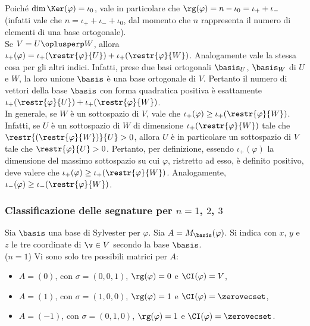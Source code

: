 \begin{remark}
	\li Poiché $\dim \Ker(\varphi) = \iota_0$, vale in particolare che $\rg(\varphi) = n - \iota_0 = \iota_+ + \iota_-$ (infatti vale che $n = \iota_+ + \iota_- + \iota_0$, dal momento che $n$ rappresenta il numero di elementi di una base ortogonale). \\
	
	\li Se $V = U \oplusperp W$, allora $\iota_+(\varphi) = \iota_+(\restr{\varphi}{U}) + \iota_+(\restr{\varphi}{W})$.
	Analogamente vale la stessa cosa per gli altri indici. Infatti,
	prese due basi ortogonali $\basis_U$, $\basis_W$ di $U$ e $W$,
	la loro unione $\basis$ è una base ortogonale di $V$. Pertanto
	il numero di vettori della base $\basis$ con forma quadratica positiva
	è esattamente $\iota_+(\restr{\varphi}{U}) + \iota_+(\restr{\varphi}{W})$. \\
	
	\li In generale, se $W$ è un sottospazio di $V$, vale che $\iota_+(\varphi) \geq \iota_+(\restr{\varphi}{W})$.
	Infatti, se $U$ è un sottospazio di $W$ di dimensione $\iota_+(\restr{\varphi}{W})$ tale che
	$\restr{(\restr{\varphi}{W})}{U} > 0$, allora $U$ è in particolare un sottospazio di $V$ tale che $\restr{\varphi}{U} > 0$. Pertanto, per definizione, essendo $\iota_+(\varphi)$ la dimensione del massimo sottospazio su cui $\varphi$, ristretto ad esso, è definito positivo, deve valere che $\iota_+(\varphi) \geq \iota_+(\restr{\varphi}{W})$. Analogamente, $\iota_-(\varphi) \geq \iota_-(\restr{\varphi}{W})$.
\end{remark}

\subsubsection{Classificazione delle segnature per $n = 1$, $2$, $3$}

Sia $\basis$ una base di Sylvester per $\varphi$. Sia $A = M_\basis(\varphi)$. Si indica con $x$, $y$ e $z$
le tre coordinate di $\v \in V$ secondo la base $\basis$. \\

\mbox{($n = 1$)} Vi sono solo tre possibili matrici per $A$:

\begin{itemize}
	\item $A = (0)$, con $\sigma = (0, 0, 1)$, $\rg(\varphi) = 0$ e $\CI(\varphi) = V$,
	\item $A = (1)$, con $\sigma = (1, 0, 0)$, $\rg(\varphi) = 1$ e $\CI(\varphi) = \zerovecset$,
	\item $A = (-1)$, con $\sigma = (0, 1, 0)$, $\rg(\varphi) = 1$ e $\CI(\varphi) = \zerovecset$.
\end{itemize}

